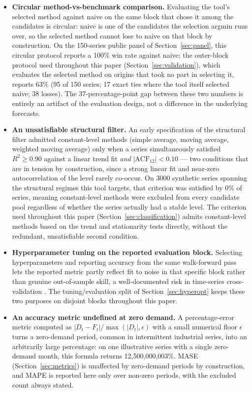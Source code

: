 \documentclass[forecasting,article,submit,pdftex,moreauthors]{Definitions/mdpi}
\begin{document}
\begin{itemize}
\item \textbf{Circular method-vs-benchmark comparison.} Evaluating the tool's selected method against naive on the same block that chose it among the candidates is circular: naive is one of the candidates the selection argmin runs over, so the selected method cannot lose to naive on that block by construction. On the 150-series public panel of Section~\ref{sec:panel}, this circular protocol reports a 100\% win rate against naive; the outer-block protocol used throughout this paper (Section~\ref{sec:validation}), which evaluates the selected method on origins that took no part in selecting it, reports 63\% (95 of 150 series; 17 exact ties where the tool itself selected naive; 38 losses). The 37-percentage-point gap between these two numbers is entirely an artifact of the evaluation design, not a difference in the underlying forecasts.
\item \textbf{An unsatisfiable structural filter.} An early specification of the structural filter admitted constant-level methods (simple average, moving average, weighted moving average) only when a series simultaneously satisfied $R^2 \geq 0.90$ against a linear trend fit \emph{and} $|\text{ACF}_{12}| < 0.10$ --- two conditions that are in tension by construction, since a strong linear fit and near-zero autocorrelation of the level rarely co-occur. On 3000 synthetic series spanning the structural regimes this tool targets, that criterion was satisfied by 0\% of series, meaning constant-level methods were excluded from every candidate pool regardless of whether the series actually had a stable level. The criterion used throughout this paper (Section~\ref{sec:classification}) admits constant-level methods based on the trend and stationarity tests directly, without the redundant, unsatisfiable second condition.
\item \textbf{Hyperparameter tuning on the reported evaluation block.} Selecting hyperparameters and reporting accuracy from the same walk-forward pass lets the reported metric partly reflect fit to noise in that specific block rather than genuine out-of-sample skill, a well-documented risk in time-series cross-validation \cite{bergmeir2012,tashman2000}. The tuning/evaluation split of Section~\ref{sec:hyperopt} keeps these two purposes on disjoint blocks throughout this paper.
\item \textbf{An accuracy metric undefined at zero demand.} A percentage-error metric computed as $|D_t-F_t|/\max(|D_t|,\epsilon)$ with a small numerical floor $\epsilon$ turns a zero-demand period, common in intermittent industrial series, into an arbitrarily large percentage: on one illustrative series with a single zero-demand month, this formula returns 12{,}500{,}000{,}003\%. MASE (Section~\ref{sec:metrics}) is unaffected by zero-demand periods by construction, and MAPE is reported here only over non-zero periods, with the excluded count always stated.

\end{itemize}
\end{document}
